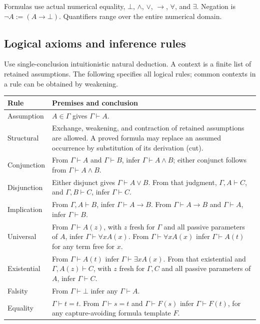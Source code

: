 \documentclass[11pt]{article}
\theoremstyle{definition}
\newcommand{\G}{\Gamma}
\begin{document}
Formulas use actual numerical equality, $\bot$, $\land$, $\lor$, $\to$, $\forall$, and $\exists$. Negation is $\neg A:=(A\to\bot)$. Quantifiers range over the entire numerical domain.

\subsection{Logical axioms and inference rules}

Use single-conclusion intuitionistic natural deduction. A context is a finite list of retained assumptions. The following specifies all logical rules; common contexts in a rule can be obtained by weakening.

\begin{longtable}{p{}p{}}
\toprule
Rule & Premises and conclusion\\
\midrule
\endhead
Assumption & $A\in\G$ gives $\G\vdash A$.\\[3pt]
Structural & Exchange, weakening, and contraction of retained assumptions are allowed. A proved formula may replace an assumed occurrence by substitution of its derivation (cut).\\[3pt]
Conjunction & From $\G\vdash A$ and $\G\vdash B$, infer $\G\vdash A\land B$; either conjunct follows from $\G\vdash A\land B$.\\[3pt]
Disjunction & Either disjunct gives $\G\vdash A\lor B$. From that judgment, $\G,A\vdash C$, and $\G,B\vdash C$, infer $\G\vdash C$.\\[3pt]
Implication & From $\G,A\vdash B$, infer $\G\vdash A\to B$. From $\G\vdash A\to B$ and $\G\vdash A$, infer $\G\vdash B$.\\[3pt]
Universal & From $\G\vdash A(z)$, with $z$ fresh for $\G$ and all passive parameters of $A$, infer $\G\vdash\forall x A(x)$. From $\G\vdash\forall x A(x)$ infer $\G\vdash A(t)$ for any term free for $x$.\\[3pt]
Existential & From $\G\vdash A(t)$ infer $\G\vdash\exists x A(x)$. From that existential and $\G,A(z)\vdash C$, with $z$ fresh for $\G,C$ and all passive parameters of $A$, infer $\G\vdash C$.\\[3pt]
Falsity & From $\G\vdash\bot$ infer any $\G\vdash A$.\\[3pt]
Equality & $\G\vdash t=t$. From $\G\vdash s=t$ and $\G\vdash F(s)$ infer $\G\vdash F(t)$, for any capture-avoiding formula template $F$.\\
\bottomrule
\end{longtable}
\end{document}
